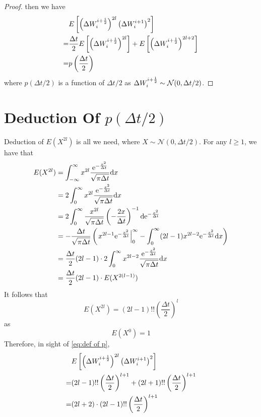 \documentclass{homework}
\begin{document}
\begin{proof}
        then we have
        \renewcommand{\theequation}{A.\arabic{equation}}
        \begin{equation}
            \label{eq:def of p}
            \begin{aligned}
            &E\left[
            \left(\Delta W_{i}^{i+\frac{1}{2}}\right)^{2l}
            \left(\Delta W_{i}^{i+1}\right)^2
            \right]\\
            =&\frac{\Delta t}{2}E\left[\left(\Delta W_{i}^{i+\frac{1}{2}}\right)^{2l}\right]
            +E\left[\left(\Delta W_{i}^{i+\frac{1}{2}}\right)^{2l+2}\right]\\
            =&p\left(\frac{\Delta t}{2}\right)
            \end{aligned}
        \end{equation}
        where $p(\Delta t/2)$ is a function of $\Delta t/2$
        as $\Delta W_{i}^{i+\frac{1}{2}}\sim\mathcal N(0,\Delta t/2)$.
    \end{proof}

    \section[Deduction Of p(Delta t/2)]{Deduction Of $p(\Delta t/2)$}
    \label{sec:deduction of p}
    Deduction of $E(X^{2l})$ is all we need, where $X\sim\mathcal N(0,\Delta t/2)$.
    For any $l\geq 1$, we have that
    \[\begin{aligned}
        E(X^{2l})&=\int_{-\infty}^\infty
        x^{2l}\frac{\mathrm e^{-\frac{x^2}{\Delta t}}}{\sqrt{\pi\Delta t}}
        \mathrm d x\\
        &=2\int_{0}^\infty
        x^{2l}\frac{\mathrm e^{-\frac{x^2}{\Delta t}}}{\sqrt{\pi\Delta t}}
        \mathrm d x\\
        &=2\int_{0}^\infty
        \frac{x^{2l}}{\sqrt{\pi\Delta t}}
        \left(-\frac{2x}{\Delta t}\right)^{-1}
        \mathrm d \mathrm e^{-\frac{x^2}{\Delta t}}\\
        &=-\frac{\Delta t}{\sqrt{\pi\Delta t}}
        \left(\left.x^{2l-1}\mathrm e^{-\frac{x^2}{\Delta t}}\right|^\infty_0
        -\int_0^\infty(2l-1)x^{2l-2}\mathrm e^{-\frac{x^2}{\Delta t}}\mathrm d x
        \right)\\
        &=\frac{\Delta t}{2}(2l-1)\cdot
        2\int_0^\infty x^{2l-2}\frac{\mathrm e^{-\frac{x^2}{\Delta t}}}{\sqrt{\pi\Delta t}}\mathrm d x\\
        &=\frac{\Delta t}{2}(2l-1)\cdot E(X^{2(l-1)})
    \end{aligned}\]
    It follows that
    \[E(X^{2l})=(2l-1)!!\left(\frac{\Delta t}{2}\right)^l\]
    as
    \[E(X^0)=1\]
    Therefore, in sight of \cref{eq:def of p},
    \[\begin{aligned}
        &E\left[\left(\Delta W_{i}^{i+\frac{1}{2}}\right)^{2l}
        \left(\Delta W_{i}^{i+1}\right)^2\right]\\
        =&(2l-1)!!\left(\frac{\Delta t}{2}\right)^{l+1}
        +(2l+1)!!\left(\frac{\Delta t}{2}\right)^{l+1}\\
        =&(2l+2)\cdot(2l-1)!!\left(\frac{\Delta t}{2}\right)^{l+1}
    \end{aligned}\]
\end{document}
